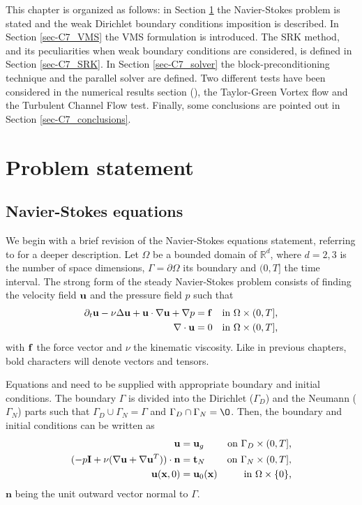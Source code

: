This chapter is organized as follows: in Section \ref{sec-C7_prob_statement} the Navier-Stokes problem is stated and the weak Dirichlet boundary conditions imposition is described. In Section \ref{sec-C7_VMS} the VMS formulation is introduced. The SRK method, and its peculiarities when weak boundary conditions are considered, is defined in Section \ref{sec-C7_SRK}. In Section \ref{sec-C7_solver} the block-preconditioning technique and the parallel solver are defined. Two different tests have been considered in the numerical results section (), the Taylor-Green Vortex flow and the Turbulent Channel Flow test. Finally, some conclusions are pointed out in Section \ref{sec-C7_conclusions}.

\section{Problem statement}
\label{sec-C7_prob_statement}
\subsection{Navier-Stokes equations}
\label{subsec:C7_NS_eq}
We begin with a brief revision of the Navier-Stokes equations statement, referring to  for a deeper description. Let $\Omega$ be a bounded domain of $\mathbb{R}^d$, where $d=2,3$ is the number of space dimensions, $\Gamma=\partial\Omega$ its boundary and $(0,T]$ the time interval. The strong form of the steady Navier-Stokes problem consists of finding the velocity field ${\bf u}$ and the pressure field $p$ such that 
\begin{align}
\label{eq-C7_NS_strong_mome}
\partial_t{\bf u}-\nu\Delta{\bf u}+{\bf u}\cdot\nabla{\bf u}+\nabla p&={\bf f}&\mbox{in $\Omega\times(0,T]$,}\\
\label{eq-C7_NS_strong_inc}
\nabla\cdot{\bf u}&=0&\mbox{in $\Omega\times(0,T]$,}
\end{align}
with ${\bf f}$ the force vector and $\nu$ the kinematic viscosity. Like in previous chapters, bold characters will denote vectors and tensors.

Equations  and  need to be supplied with appropriate boundary and initial conditions. The boundary $\Gamma$ is divided into the Dirichlet ($\Gamma_D$) and the Neumann ($\Gamma_N$) parts such that $\Gamma_D\cup\Gamma_N=\Gamma$ and $\Gamma_D\cap\Gamma_N=\O$. Then, the boundary and initial conditions can be written as
\begin{align}
\label{eq-C7_NS_strong_Dir}
{\bf u}&={\bf u}_g&\mbox{on $\Gamma_D\times(0,T]$,}\\
\label{eq-C7_NS_strong_Neu}
(-p\mathbf{I}+\nu(\nabla{\bf u}+\nabla{\bf u}^T))\cdot\mathbf{n}&=\mathbf{t}_N&\mbox{on $\Gamma_N\times(0,T]$,}\\
\label{eq-C7_NS_strong_Ini}
{\bf u}({\bf x},0)&={\bf u}_0({\bf x})&\mbox{in $\Omega\times\{0\}$,}
\end{align}
$\mathbf{n}$ being the unit outward vector normal to $\Gamma$.

